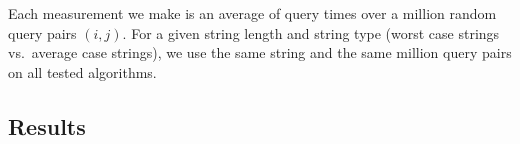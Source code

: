 \documentclass[a4]{article}
\begin{document}
Each measurement we make is an average of query times over a million random query pairs $(i, j)$. For a given string length and string type (worst case strings vs.\ average case strings), we use the same string and the same million query pairs on all tested algorithms.

\subsection{Results}
\end{document}
